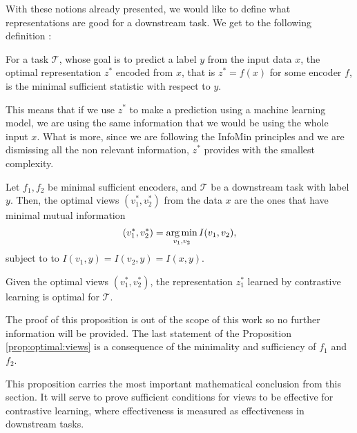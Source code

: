 With these notions already presented, we would like to define what representations are good for a downstream task. We get to the following definition \citep{tian_what_2020}:
\begin{ndef}
For a task $\mathcal T$, whose goal is to predict a label $y$ from the input data $x$, the optimal representation $z^*$ encoded from $x$, that is $z^* = f(x)$ for some encoder $f$, is the minimal sufficient statistic with respect to $y$.
\end{ndef}
This means that if we use $z^*$ to make a prediction using a machine learning model, we are using the same information that we would be using the whole input $x$. What is more, since we are following the InfoMin principles and we are dismissing all the non relevant information, $z^*$ provides with the smallest complexity.

\begin{nprop}\label{prop:optimal:views}
Let $f_1,f_2$ be minimal sufficient encoders, and $\mathcal T$ be a downstream task with label $y$. Then, the optimal views $(v_1^*,v_2^*)$ from the data $x$ are the ones that have minimal mutual information
\[
    (v_1^*,v_2^*) = \operatorname*{arg\,min}_{v_1,v_2} I(v_1,v_2),
\]
subject to to $I(v_1,y) = I(v_2,y) = I(x,y)$.

Given the optimal views $(v_1^*,v_2^*)$, the representation $z_1^*$ learned by contrastive learning is optimal for $\mathcal T$.
\end{nprop}
The proof of this proposition is out of the scope of this work so no further information will be provided. The last statement of the Proposition \ref{prop:optimal:views} is a consequence of the minimality and sufficiency of $f_1$ and $f_2$. 

This proposition carries the most important mathematical conclusion from this section. It will serve to prove sufficient conditions for views to be effective for contrastive learning, where effectiveness is measured as effectiveness in downstream tasks.



